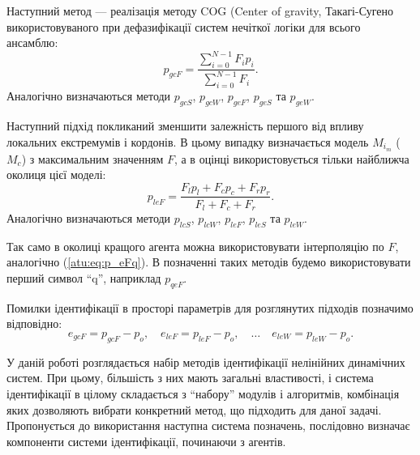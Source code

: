 \documentclass[a4paper,13pt]{atuaref}
\begin{document}
Наступний метод --- реалізація методу COG (Center of gravity, Такагі-Сугено %
використовуваного при дефазифікації систем нечіткої логіки для всього
ансамблю:
%
\begin{equation}
  p_{gcF}
  =
  \frac{\sum\limits_{i=0}^{N-1} F_{i} p_{i}}
       {\sum\limits_{i=0}^{N-1} F_{i} }
  .
  \label{atu:eq:p_gcF}
\end{equation}
%
Аналогічно визначаються методи
$p_{gcS}$,
$p_{gcW}$,
$p_{geF}$,
$p_{geS}$ та
$p_{geW}$.


Наступний підхід покликаний зменшити залежність першого від впливу локальних
екстремумів і кордонів. В цьому випадку визначається модель $ M_{i_{m}} $ ($ M_{c} $) з
максимальним значенням $ F $, а в оцінці використовується тільки найближча
околиця цієї моделі:
%
\begin{equation}
  p_{leF}
  =
  \frac{ F_{l} p_{l} + F_{c} p_{c} + F_{r} p_{r} }
       { F_{l}       + F_{c}       + F_{r}       }
  .
  \label{atu:eq:p_lcFl}
\end{equation}
%
Аналогічно визначаються методи
$p_{lcS}$,
$p_{lcW}$,
$p_{leF}$,
$p_{leS}$ та
$p_{leW}$.


Так само в околиці кращого агента можна використовувати інтерполяцію по
$ F $, аналогічно (\ref{atu:eq:p_eFq}). В позначенні таких методів будемо
використовувати перший символ ``q'', наприклад $ p_{qeF}$.

Помилки ідентифікації в просторі параметрів для розглянутих підходів позначимо відповідно:
%
\begin{equation}
  e_{gcF} = p_{gcF} - p_o,
  \quad
  e_{leF} = p_{leF} - p_o,
  \quad
  \ldots
  \quad
  e_{leW} = p_{leW} - p_o.
  \label{atu:eq:e_xx}
\end{equation}
%

У даній роботі розглядається набір методів ідентифікації нелінійних динамічних
систем. При цьому, більшість з них мають загальні властивості, і система
ідентифікації в цілому складається з ``набору'' модулів і алгоритмів,
комбінація яких дозволяють вибрати конкретний метод, що підходить для даної
задачі.
Пропонується до використання наступна система позначень, послідовно визначає
компоненти системи ідентифікації, починаючи з агентів.
\end{document}
